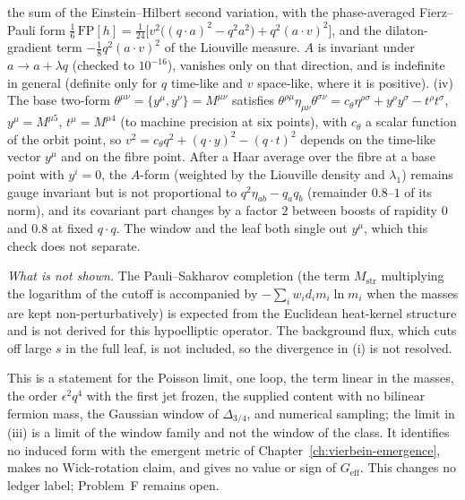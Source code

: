 the sum of the Einstein--Hilbert second variation, with the phase-averaged Fierz--Pauli form \(\tfrac16\,\mathrm{FP}[h]=\tfrac1{24}\bigl[v^2\bigl((q\cdot a)^2-q^2a^2\bigr)+q^2(a\cdot v)^2\bigr]\), and the dilaton-gradient term \(-\tfrac18q^2(a\cdot v)^2\) of the Liouville measure. \(A\) is invariant under \(a\to a+\lambda q\) (checked to \(10^{-16}\)), vanishes only on that direction, and is indefinite in general (definite only for \(q\) time-like and \(v\) space-like, where it is positive). (iv) The base two-form \(\theta^{\mu\nu}=\{y^\mu,y^\nu\}=M^{\mu\nu}\) satisfies \(\theta^{\rho\mu}\eta_{\mu\nu}\theta^{\sigma\nu}=c_\theta\eta^{\rho\sigma}+y^\rho y^\sigma-t^\rho t^\sigma\), \(y^\mu=M^{\mu5}\), \(t^\mu=M^{\mu4}\) (to machine precision at six points), with \(c_\theta\) a scalar function of the orbit point, so \(v^2=c_\theta q^2+(q\cdot y)^2-(q\cdot t)^2\) depends on the time-like vector \(y^\mu\) and on the fibre point. After a Haar average over the fibre at a base point with \(y^i=0\), the \(A\)-form (weighted by the Liouville density and \(\lambda_1\)) remains gauge invariant but is not proportional to \(q^2\eta_{ab}-q_aq_b\) (remainder \(0.8\)--\(1\) of its norm), and its covariant part changes by a factor \(2\) between boosts of rapidity \(0\) and \(0.8\) at fixed \(q\cdot q\). The window and the leaf both single out \(y^\mu\), which this check does not separate.



\emph{What is not shown.} The Pauli--Sakharov completion (the term \(M_{\mathrm{str}}\) multiplying the logarithm of the cutoff is accompanied by \(-\sum_iw_id_im_i\ln m_i\) when the masses are kept non-perturbatively) is expected from the Euclidean heat-kernel structure and is not derived for this hypoelliptic operator. The background flux, which cuts off large \(s\) in the full leaf, is not included, so the divergence in (i) is not resolved.



This is a statement for the Poisson limit, one loop, the term linear in the masses, the order \(\epsilon^2q^4\) with the first jet frozen, the supplied content with no bilinear fermion mass, the Gaussian window of \(\Delta_{3/4}\), and numerical sampling; the limit in (iii) is a limit of the window family and not the window of the class. It identifies no induced form with the emergent metric of Chapter~\ref{ch:vierbein-emergence}, makes no Wick-rotation claim, and gives no value or sign of \(G_{\mathrm{eff}}\). This changes no ledger label; Problem~F remains open.



